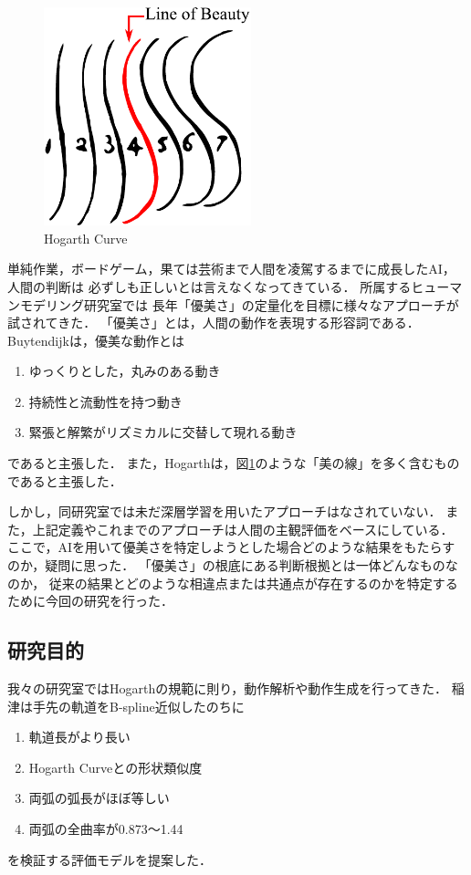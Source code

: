 \begin{figure}[t]
  \begin{center}
    \includegraphics[width=60mm]{images/quote/hogarth_curve.pdf}
  \end{center}
  \caption{Hogarth Curve}
  \label{hogarth_curve}
\end{figure}

単純作業，ボードゲーム，果ては芸術まで人間を凌駕するまでに成長したAI，人間の判断は
必ずしも正しいとは言えなくなってきている．
所属するヒューマンモデリング研究室では
長年「優美さ」の定量化を目標に様々なアプローチが試されてきた．
「優美さ」とは，人間の動作を表現する形容詞である．
Buytendijk\cite{buytendijk}は，優美な動作とは
\begin{enumerate}
  \item ゆっくりとした，丸みのある動き
  \item 持続性と流動性を持つ動き
  \item 緊張と解繁がリズミカルに交替して現れる動き
\end{enumerate}
であると主張した．
また，Hogarth\cite{hogarth}は，図\ref{hogarth_curve}のような「美の線」を多く含むものであると主張した．

しかし，同研究室では未だ深層学習を用いたアプローチはなされていない．
また，上記定義やこれまでのアプローチは人間の主観評価をベースにしている．
ここで，AIを用いて優美さを特定しようとした場合どのような結果をもたらすのか，疑問に思った．
「優美さ」の根底にある判断根拠とは一体どんなものなのか，
従来の結果とどのような相違点または共通点が存在するのかを特定するために今回の研究を行った．
\clearpage

\subsection{研究目的}
我々の研究室ではHogarthの規範に則り，動作解析や動作生成を行ってきた．
稲津\cite{inazu}は手先の軌道をB-spline近似\cite{bspline}したのちに
\begin{enumerate}
  \item 軌道長がより長い
  \item Hogarth Curveとの形状類似度
  \item 両弧の弧長がほぼ等しい
  \item 両弧の全曲率が0.873〜1.44
\end{enumerate}
を検証する評価モデルを提案した．

